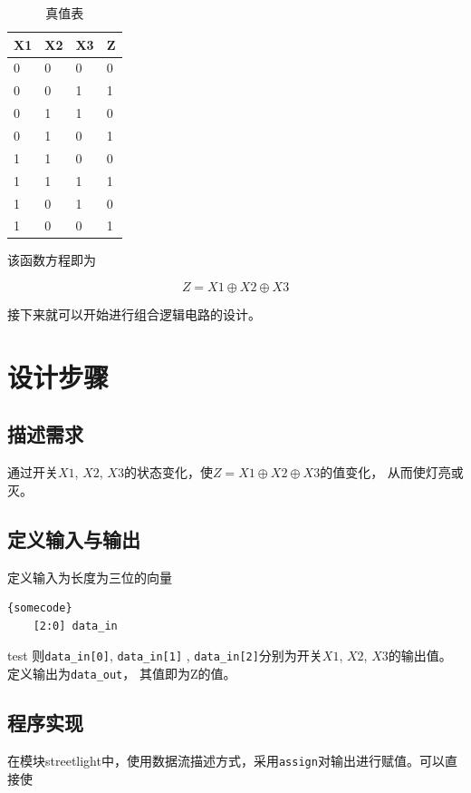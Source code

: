 \documentclass[UTF8]{article}
\begin{document}
\begin{table}[!htbp]
\centering
\begin{tabu} to 0.8\textwidth{ X[c] | X[c] | X[c] | X[c] }
    \hline
    X1 & X2 & X3 & Z \\
    \hline{} & 0 & 0 & 0\\
    0 & 0 & 1 & 1\\
    0 & 1 & 1 & 0\\
    0 & 1 & 0 & 1\\
    1 & 1 & 0 & 0\\
    1 & 1 & 1 & 1\\
    1 & 0 & 1 & 0\\
    1 & 0 & 0 & 1\\

    \end{tabu}
\caption{真值表}
\end{table}
该函数方程即为  

$$Z = X1\oplus X2\oplus X3$$

接下来就可以开始进行组合逻辑电路的设计。

\section{设计步骤}
\subsection{描述需求}

通过开关$X1$, $X2$, $X3$的状态变化，使$Z = X1⊕X2⊕X3$的值变化，
从而使灯亮或灭。

\subsection{定义输入与输出}

定义输入为长度为三位的向量 

\lstset{language=verilog}
\begin{lstlisting}[frame=tb]{somecode}
    [2:0] data_in
\end{lstlisting}

{test}
则\lstinline{data_in[0]},
\lstinline$data_in[1]$ , \lstinline$data_in[2]$分别为开关$X1$, $X2$, $X3$的输出值。
定义输出为\lstinline$data_out$，
其值即为Z的值。

\subsection{程序实现}

在模块streetlight中，使用数据流描述方式，采用\lstinline{assign}对输出进行赋值。可以直接使
\end{document}
